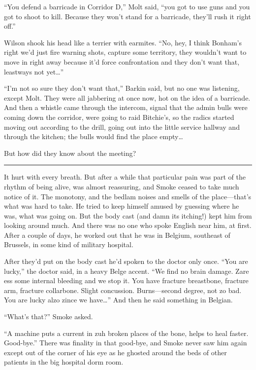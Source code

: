 ``You defend a barricade in Corridor D,'' Molt said, ``you got to use guns and you got to shoot to kill. Because they won't stand for a barricade, they'll rush it right off.''

Wilson shook his head like a terrier with earmites. ``No, hey, I think Bonham's right we'd just fire warning shots, capture some territory, they wouldn't want to move in right away because it'd force confrontation and they don't want that, leastways not yet\ldots ''

``I'm not so sure they don't want that,'' Barkin said, but no one was listening, except Molt. They were all jabbering at once now, hot on the idea of a barricade. And then a whistle came through the intercom, signal that the admin bulls were coming down the corridor, were going to raid Bitchie's, so the radics started moving out according to the drill, going out into the little service hallway and through the kitchen; the bulls would find the place empty\ldots

But how did they know about the meeting?

\fancybreak{* * *}

It hurt with every breath. But after a while that particular pain was part of the rhythm of being alive, was almost reassuring, and Smoke ceased to take much notice of it. The monotony, and the bedlam noises and smells of the place---that's what was hard to take. He tried to keep himself amused by guessing where he was, what was going on. But the body cast (and damn its itching!) kept him from looking around much. And there was no one who spoke English near him, at first. After a couple of days, he worked out that he was in Belgium, southeast of Brussels, in some kind of military hospital.

After they'd put on the body cast he'd spoken to the doctor only once. ``You are lucky,'' the doctor said, in a heavy Belge accent. ``We find no brain damage. Zare ess some internal bleeding and we stop it. You have fracture breastbone, fracture arm, fracture collarbone. Slight concussion. Burns---second degree, not zo bad. You are lucky alzo zince we have\ldots '' And then he said something in Belgian.

``What's that?'' Smoke asked.

``A machine puts a current in zuh broken places of the bone, helps to heal faster. Good-bye.'' There was finality in that good-bye, and Smoke never saw him again except out of the corner of his eye as he ghosted around the beds of other patients in the big hospital dorm room.


